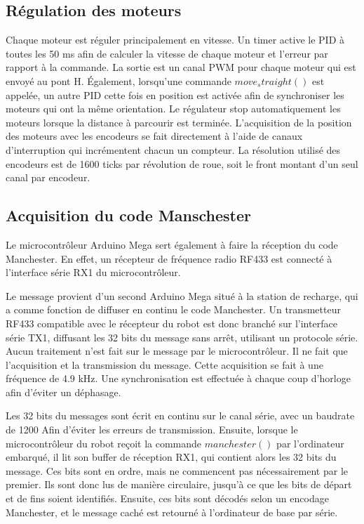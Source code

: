 \subsection{Régulation des moteurs}

Chaque moteur est réguler principalement en vitesse. Un timer active le PID à toutes les 50 ms afin de calculer la vitesse de chaque moteur et l’erreur par rapport à la commande. La sortie est un canal PWM pour chaque moteur qui est envoyé au pont H. Également, lorsqu’une commande $move_straight()$ est appelée, un autre PID cette fois en position est activée afin de synchroniser les moteurs qui ont la même orientation. Le régulateur stop automatiquement les moteurs lorsque la distance à parcourir est terminée. L'acquisition de la position des moteurs avec les encodeurs se fait directement à l’aide de canaux d’interruption qui incrémentent chacun un compteur. La résolution utilisé des encodeurs est de 1600 ticks par révolution de roue, soit le front montant d’un seul canal par encodeur.


\subsection{Acquisition du code Manschester}

Le microcontrôleur Arduino Mega sert également à faire la réception du code Manchester. En effet, un récepteur de fréquence radio RF433 est connecté à l’interface série RX1 du microcontrôleur. 

Le message provient d’un second Arduino Mega situé à la station de recharge, qui a comme fonction de diffuser en continu le code Manchester. Un transmetteur RF433 compatible avec le récepteur du robot est donc branché sur l’interface série TX1, diffusant les 32 bits du message sans arrêt, utilisant un protocole série. Aucun traitement n’est fait sur le message par le microcontrôleur. Il ne fait que l’acquisition et la transmission du message. Cette acquisition se fait à une fréquence de 4.9 kHz. Une synchronisation est effectuée à chaque coup d’horloge afin d’éviter un déphasage.

Les 32 bits du messages sont écrit en continu sur le canal série, avec un baudrate de 1200 Afin d’éviter les erreurs de transmission. Ensuite, lorsque le microcontrôleur du robot reçoit la commande $manchester()$ par l’ordinateur embarqué, il lit son buffer de réception RX1, qui contient alors les 32 bits du message. Ces bits sont en ordre, mais ne commencent pas nécessairement par le premier. Ils sont donc lus de manière circulaire, jusqu’à ce que les bits de départ et de fins soient identifiés. Ensuite, ces bits sont décodés selon un encodage Manchester, et le message caché est retourné à l’ordinateur de base par série.

